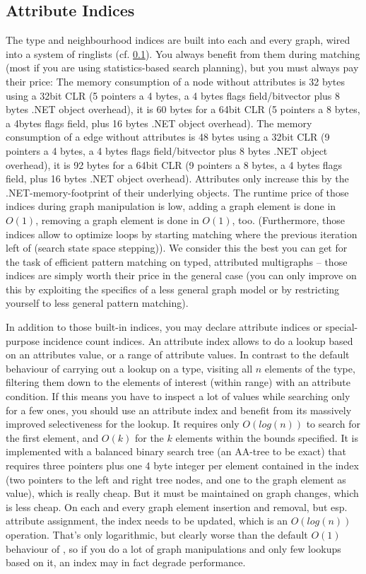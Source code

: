 \subsection{Attribute Indices}
The type and neighbourhood indices are built into each and every \GrG{} graph, wired into a system of ringlists (cf. \ref{}).
You always benefit from them during matching (most if you are using statistics-based search planning), but you must always pay their price:
The memory consumption of a \GrG{} node without attributes is 32 bytes using a 32bit CLR (5 pointers a 4 bytes, a 4 bytes flags field/bitvector plus 8 bytes .NET object overhead), it is 60 bytes for a 64bit CLR (5 pointers a 8 bytes, a 4bytes flags field, plus 16 bytes .NET object overhead).
The memory consumption of a \GrG{} edge without attributes is 48 bytes using a 32bit CLR (9 pointers a 4 bytes, a 4 bytes flags field/bitvector plus 8 bytes .NET object overhead), it is 92 bytes for a 64bit CLR (9 pointers a 8 bytes, a 4 bytes flags field, plus 16 bytes .NET object overhead).
Attributes only increase this by the .NET-memory-footprint of their underlying objects.
The runtime price of those indices during graph manipulation is low, adding a graph element is done in $O(1)$, removing a graph element is done in $O(1)$, too. 
(Furthermore, those indices allow to optimize loops by starting matching where the previous iteration left of (search state space stepping)).
We consider this the best you can get for the task of efficient pattern matching on typed, attributed multigraphs -- those indices are simply worth their price in the general case (you can only improve on this by exploiting the specifics of a less general graph model or by restricting yourself to less general pattern matching).

In addition to those built-in indices, you may declare attribute indices or special-purpose incidence count indices.
An attribute index allows to do a lookup based on an attributes value, or a range of attribute values.
In contrast to the default behaviour of carrying out a lookup on a type, visiting all $n$ elements of the type, filtering them down to the elements of interest (within range) with an attribute condition.
If this means you have to inspect a lot of values while searching only for a few ones, you should use an attribute index and benefit from its massively improved selectiveness for the lookup.
It requires only $O(log(n))$ to search for the first element, and $O(k)$ for the $k$ elements within the bounds specified.
It is implemented with a balanced binary search tree (an AA-tree\cite{} to be exact) that requires three pointers plus one 4 byte integer per element contained in the index (two pointers to the left and right tree nodes, and one to the graph element as value), which is really cheap.
But it must be maintained on graph changes, which is less cheap.
On each and every graph element insertion and removal, but esp. attribute assignment, the index needs to be updated, which is an $O(log(n))$ operation.
That's only logarithmic, but clearly worse than the default $O(1)$ behaviour of \GrG{}, so if you do a lot of graph manipulations and only few lookups based on it, an index may in fact degrade performance.

